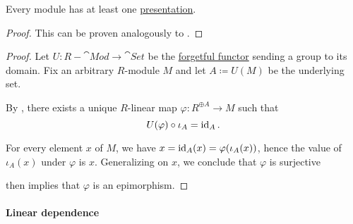 \begin{proposition}\label{thm:module_presentation_existence}
  Every module has at least one \hyperref[def:module_presentation]{presentation}.
\end{proposition}
\begin{proof}
  This can be proven analogously to .
\end{proof}
\begin{proof}
  Let \( U: R-\cat{Mod} \to \cat{Set} \) be the \hyperref[def:concrete_category]{forgetful functor} sending a group to its domain.
  Fix an arbitrary \( R \)-module \( M \) and let \( A \coloneqq U(M) \) be the underlying set.

  By , there exists a unique \( R \)-linear map \( \varphi: R^{\oplus A} \to M \) such that
  \begin{equation*}
    U(\varphi) \bincirc \iota_A = \id_A.
  \end{equation*}

  For every element \( x \) of \( M \), we have \( x = \operatorname{id}_A(x) = \varphi(\iota_A(x)) \), hence the value of \( \iota_A(x) \) under \( \varphi \) is \( x \). Generalizing on \( x \), we conclude that \( \varphi \) is surjective

   then implies that \( \varphi \) is an epimorphism.
\end{proof}

\paragraph{Linear dependence}

